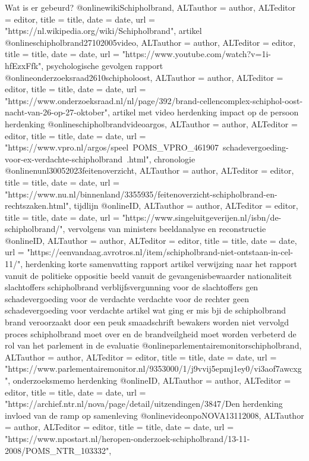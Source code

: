 {{{{{Wat is er gebeurd?
@online{wikiSchipholbrand,	ALTauthor = {author},	ALTeditor = {editor},	title = {title},	date = {date},	url = {"https://nl.wikipedia.org/wiki/Schipholbrand"},}
artikel
@online{schipholbrand27102005video,	ALTauthor = {author},	ALTeditor = {editor},	title = {title},	date = {date},	url = {"https://www.youtube.com/watch?v=1i-hfEzxFfk"},}
psychologische gevolgen
rapport
@online{onderzoeksraad2610schipholoost,	ALTauthor = {author},	ALTeditor = {editor},	title = {title},	date = {date},	url = {"https://www.onderzoeksraad.nl/nl/page/392/brand-cellencomplex-schiphol-oost-nacht-van-26-op-27-oktober"},}
artikel met video
herdenking
impact op de persoon
herdenking
@online{schipholbrandvideoargos,	ALTauthor = {author},	ALTeditor = {editor},	title = {title},	date = {date},	url = {"https://www.vpro.nl/argos/speel~POMS_VPRO_461907~schadevergoeding-voor-ex-verdachte-schipholbrand~.html"},}
chronologie
@online{nunl30052023feitenoverzicht,	ALTauthor = {author},	ALTeditor = {editor},	title = {title},	date = {date},	url = {"https://www.nu.nl/binnenland/3355935/feitenoverzicht-schipholbrand-en-rechtszaken.html"},}
tijdlijn
@online{ID,	ALTauthor = {author},	ALTeditor = {editor},	title = {title},	date = {date},	url = {"https://www.singeluitgeverijen.nl/isbn/de-schipholbrand/"},}
vervolgens van ministers
beeldanalyse en reconstructie
@online{ID,	ALTauthor = {author},	ALTeditor = {editor},	title = {title},	date = {date},	url = {"https://eenvandaag.avrotros.nl/item/schipholbrand-niet-ontstaan-in-cel-11/"},}
herdenking
korte samenvatting
rapport
artikel
verwijzing naar het rapport vanuit de politieke oppositie
beeld vanuit de gevangenisbewaarder
nationaliteit slachtoffers schipholbrand
verblijfsvergunning voor de slachtoffers
gen schadevergoeding voor de verdachte
verdachte voor de rechter
geen schadevergoeding voor verdachte
artikel wat ging er mis bji de schipholbrand
brand veroorzaakt door een peuk
smaadschrift
bewakers worden niet vervolgd
proces schipholbrand moet over en de brandveilgheid moet worden verbeterd
de rol van het parlement in de evaluatie
@online{parlementairemonitorschipholbrand,	ALTauthor = {author},	ALTeditor = {editor},	title = {title},	date = {date},	url = {"https://www.parlementairemonitor.nl/9353000/1/j9vvij5epmj1ey0/vi3aof7awcxg"},}
onderzoeksmemo
herdenking
@online{ID,	ALTauthor = {author},	ALTeditor = {editor},	title = {title},	date = {date},	url = {"https://archief.ntr.nl/nova/page/detail/uitzendingen/3847/Den%
herdenking
invloed van de ramp op samenleving
@online{videonpoNOVA13112008,	ALTauthor = {author},	ALTeditor = {editor},	title = {title},	date = {date},	url = {"https://www.npostart.nl/heropen-onderzoek-schipholbrand/13-11-2008/POMS_NTR_103332"},}
}}}}}}}
